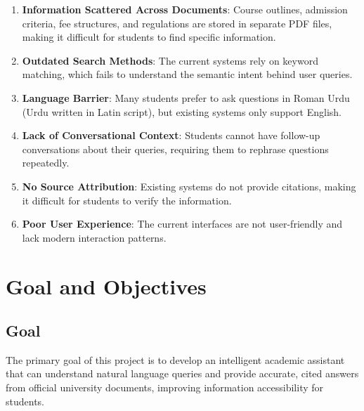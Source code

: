 \documentclass[12pt,a4paper]{book}
\numberwithin{table}{chapter}
\numberwithin{figure}{chapter}
\numberwithin{equation}{chapter}
\begin{document}
\begin{enumerate}
    \item \textbf{Information Scattered Across Documents}: Course outlines, admission criteria, fee structures, and regulations are stored in separate PDF files, making it difficult for students to find specific information.

    \item \textbf{Outdated Search Methods}: The current systems rely on keyword matching, which fails to understand the semantic intent behind user queries.

    \item \textbf{Language Barrier}: Many students prefer to ask questions in Roman Urdu (Urdu written in Latin script), but existing systems only support English.

    \item \textbf{Lack of Conversational Context}: Students cannot have follow-up conversations about their queries, requiring them to rephrase questions repeatedly.

    \item \textbf{No Source Attribution}: Existing systems do not provide citations, making it difficult for students to verify the information.

    \item \textbf{Poor User Experience}: The current interfaces are not user-friendly and lack modern interaction patterns.
\end{enumerate}

\section{Goal and Objectives}

\subsection{Goal}
The primary goal of this project is to develop an intelligent academic assistant that can understand natural language queries and provide accurate, cited answers from official university documents, improving information accessibility for students.
\end{document}
